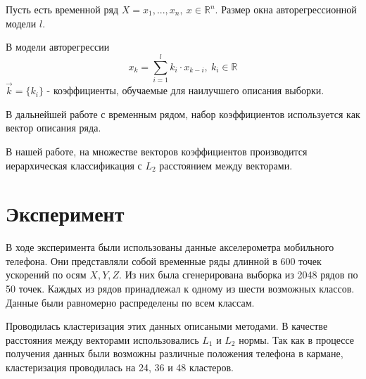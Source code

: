 \documentclass[12pt,twoside]{article}
\begin{document}
            Пусть есть временной ряд $X = x_1, ... , x_n, \ x \in \mathbb{R}^n$.
            Размер окна авторегрессионной модели $l$.

            В модели авторегрессии $$ x_k = \sum\limits_{i=1}^{l} k_i \cdot x_{k-i}, \ k_i \in \mathbb{R} $$
            $\vec{k} = \{k_i\}$ \-- коэффициенты, обучаемые для наилучшего описания выборки.

            В дальнейшей работе с временным рядом, набор коэффициентов используется как вектор описания ряда.

            В нашей работе, на множестве векторов коэффициентов производится иерархическая классификация с $L_2$ расстоянием между векторами.

        
    \section{Эксперимент}
        
        В ходе эксперимента были использованы данные акселерометра мобильного телефона.
        Они представляли собой временные ряды длинной в 600 точек ускорений по осям $X, Y, Z$.
        Из них была сгенерирована выборка из 2048 рядов по 50 точек.
        Каждых из рядов принадлежал к одному из шести возможных классов. Данные были равномерно распределены по всем классам.

        Проводилась кластеризация этих данных описаными методами. В качестве расстояния между векторами использовались $L_1$  и $L_2$ нормы.
        Так как в процессе получения данных были возможны различные положения телефона в кармане, кластеризация проводилась на 24, 36 и 48 кластеров.
\end{document}
